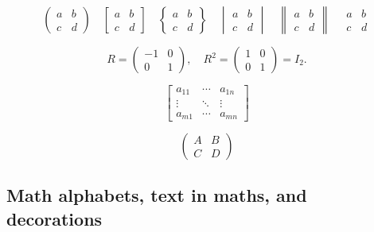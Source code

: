 \documentclass[11pt,a4paper]{article}
\theoremstyle{definition}                   %
\begin{document}
\[
\begin{pmatrix} a & b \\ c & d \end{pmatrix}
\quad
\begin{bmatrix} a & b \\ c & d \end{bmatrix}
\quad
\begin{Bmatrix} a & b \\ c & d \end{Bmatrix}
\quad
\begin{vmatrix} a & b \\ c & d \end{vmatrix}
\quad
\begin{Vmatrix} a & b \\ c & d \end{Vmatrix}
\quad
\begin{matrix} a & b \\ c & d \end{matrix}
\]

\begin{equation}
R = \begin{pmatrix} -1 & 0 \\ 0 & 1 \end{pmatrix}, \quad
R^2 = \begin{pmatrix} 1 & 0 \\ 0 & 1 \end{pmatrix} = I_2.
\label{eq:reflection}
\end{equation}

\[
\begin{bmatrix}
   a_{11} & \cdots & a_{1n} \\
   \vdots & \ddots & \vdots \\
   a_{m1} & \cdots & a_{mn}
\end{bmatrix}
\]

\[
\left(\begin{array}{c|c}
   A & B \\ \hline
   C & D
\end{array}\right)
\]

\subsection{Math alphabets, text in maths, and decorations}
\end{document}
